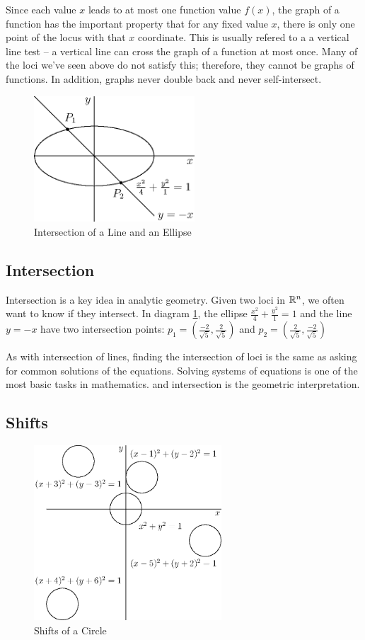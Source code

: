 \documentclass[fleqn]{report}
\begin{document}
Since each value $x$ leads to at most one function value $f(x)$,
the graph of a function has the important property that for any
fixed value $x$, there is only one point of the locus with that
$x$ coordinate. This is usually refered to a a vertical line
test -- a vertical line can cross the graph of a function at
most once. Many of the loci we've seen above do not satisfy
this; therefore, they cannot be graphs of functions. In
addition, graphs never double back and never self-intersect. 

\begin{figure}[b]
\centering
\includegraphics[width=6cm]{figure24.eps}
\caption{Intersection of a Line and an Ellipse}
\label{figure-intersection}
\end{figure}

\subsection{Intersection}
\label{intersection}

Intersection is a key idea in analytic geometry. Given two
loci in $\mathbb{R}^n$, we often want to know if they intersect.
In diagram \ref{figure-intersection}, the
ellipse $\frac{x^2}{4} + \frac{y^2}{1} = 1 $ and
the line $y=-x$ have two intersection points:
$p_1 = (\frac{-2}{\sqrt{5}},\frac{2}{\sqrt{5}})$ and
$p_2 = (\frac{2}{\sqrt{5}},\frac{-2}{\sqrt{5}})$ 

As with intersection of lines, finding the intersection of
loci is the same as asking for common solutions of the 
equations. Solving systems of equations is one of the most
basic tasks in mathematics. and intersection is the geometric
interpretation.

\subsection{Shifts}
\label{shifts}

\begin{figure}[t]
\centering
\includegraphics[width=7cm]{figure25.eps}
\caption{Shifts of a Circle}
\label{figure-shifts-circle}
\end{figure}
\end{document}
